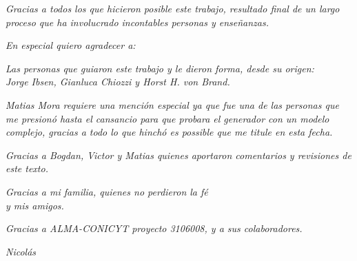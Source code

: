 \cleardoublepage
\vspace*{\fill}


\begin{center}
\emph{Gracias a todos los que hicieron posible este trabajo, resultado final de
un largo proceso que ha involucrado incontables personas y ense\~nanzas.}

\vspace{0.3cm}

\emph{En especial quiero agradecer a:}

\vspace{0.3cm}

\emph{Las personas que guiaron este trabajo y le dieron forma, desde su
origen:\\ Jorge Ibsen, Gianluca Chiozzi y  Horst H. von Brand.}

\vspace{0.3cm}
\emph{Matias Mora requiere una menci\'on especial ya que fue una de las
personas que me presion\'o hasta el cansancio para que probara el generador con un modelo
complejo, gracias a todo lo que hinch\'o es possible que me titule en esta fecha.}

\vspace{0.3cm}
\emph{Gracias a Bogdan, Victor y Matias quienes aportaron comentarios y revisiones
de este texto.}

\vspace{0.3cm}
\emph{Gracias a mi familia, quienes no perdieron la f\'e\\ y mis amigos.}

\vspace{0.3cm}
\emph{Gracias a ALMA-CONICYT proyecto 3106008, y a sus colaboradores.}
\end{center}

\vspace{0.3cm}
\hspace{11cm}
\emph{Nicol\'as}


\vspace*{\fill}



